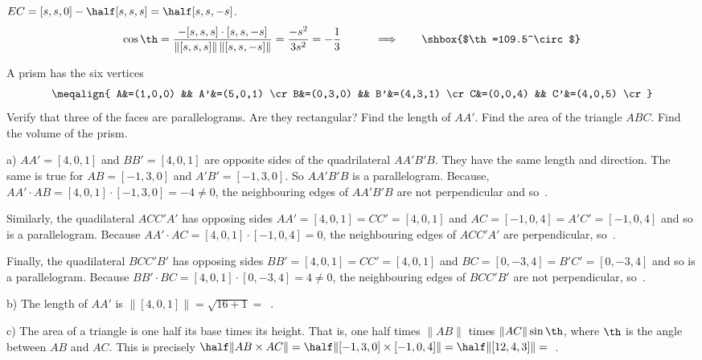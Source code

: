 {$EC=[s,s,0]-\half[s,s,s]=\half[s,s,-s]$.
$$
\cos\th =\frac{-[s,s,s]\cdot[s,s,-s]}{\|[s,s,s]\|\,\|[s,s,-s]\|}
        =\frac{-s^2}{3s^2}
        =-\frac{1}{3}
\qquad \implies\quad \shbox{$\th=109.5^\circ$}
$$
\medskip
\item{\next} 
A prism has the six vertices
$$\meqalign{
A&=(1,0,0)   &&  A'&=(5,0,1) \cr
B&=(0,3,0)   &&  B'&=(4,3,1) \cr
C&=(0,0,4)   &&  C'&=(4,0,5) \cr
}$$
 Verify that three of the faces are parallelograms.
Are they rectangular?
 Find the length of $AA'$.
 Find the area of the triangle $ABC$.
 Find the volume of the prism.
\smallskip
\item{}\soln a) $AA'=[4,0,1]$ and $BB'=[4,0,1]$ are opposite sides
of the quadrilateral $AA'B'B$. They have the same length 
and direction. The same is true for $AB=[-1,3,0]$ and $A'B'=[-1,3,0]$.
So $AA'B'B$ is a parallelogram. Because, 
$AA'\cdot AB=[4,0,1]\cdot[-1,3,0]=-4\ne 0$, the neighbouring edges of 
$AA'B'B$ are not perpendicular and so $\,$.

\item{}Similarly, the quadilateral $ACC'A'$ has opposing sides
$AA'=[4,0,1]=CC'=[4,0,1]$ and $AC=[-1,0,4]=A'C'=[-1,0,4]$ and so is
a parallelogram. Because $AA'\cdot AC=[4,0,1]\cdot[-1,0,4]= 0$, the neighbouring edges of $ACC'A'$ are perpendicular, so
$\,$.

\item{}Finally, the quadilateral $BCC'B'$ has opposing sides
$BB'=[4,0,1]=CC'=[4,0,1]$ and $BC=[0,-3,4]=B'C'=[0,-3,4]$ and so is
a parallelogram. Because $BB'\cdot BC=[4,0,1]\cdot[0,-3,4]= 4\ne 0$, the neighbouring edges of $BCC'B'$ are not perpendicular, so 
$\,$.

\item{}b) The length of $AA'$ is $\|[4,0,1]\|=\sqrt{16+1}=$
$\,$.

\item{}c) The area of a triangle is one half its base times its height. That is, one half times $\|AB\|$ times $\|AC\|\sin\th$, where $\th$ is the angle between $AB$ and $AC$. This is precisely $\half \|AB\times AC\|=\half\|[-1,3,0]\times[-1,0,4]\| =\half\|[12,4,3]\|=$
\shbox{$6\half$}$\,$.

}
